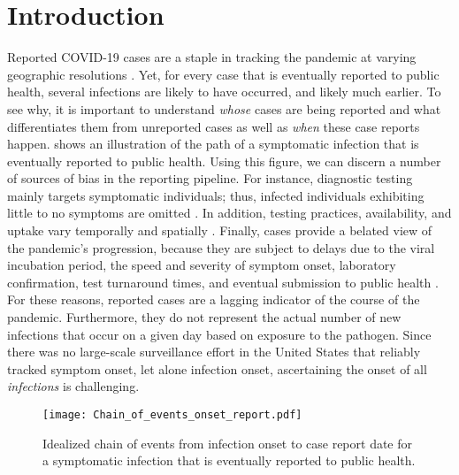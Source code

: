 \section{Introduction}
\label{sec:intro}

Reported COVID-19 cases are a staple in tracking the pandemic at varying
geographic resolutions \citep{dong2020interactive, nyt2020corona,
wp2020tracking}. Yet, for every case that is eventually reported to public
health, several infections are likely to have occurred, and likely much earlier. To
see why, it is important to understand \emph{whose} cases are being reported and
what differentiates them from unreported cases as well as \emph{when} these
case reports happen.  shows an
illustration of the path of a symptomatic infection that is eventually
reported to public health. Using this figure, we can discern a number of sources
of bias in the reporting pipeline. For instance, diagnostic testing mainly
targets symptomatic individuals; thus, infected individuals exhibiting little to
no symptoms are omitted \citep{cdc2022estimated}. In addition, testing
practices, availability, and uptake vary temporally and spatially
\citep{pitzer2021impact, ecdc2020strategies, hitchings2021usefulness}. Finally,
cases provide a belated view of the pandemic's progression, because they are
subject to delays due to the viral incubation period, the speed and severity of
symptom onset, laboratory confirmation, test turnaround times, and eventual
submission to public health \citep{pellis2021challenges, wash2020dash}. For
these reasons, reported cases are a lagging indicator of the course of the
pandemic. Furthermore, they do not represent the actual number of new infections
that occur on a given day based on exposure to the pathogen. Since there
was no large-scale surveillance effort in the United States that reliably
tracked symptom onset, let alone infection onset, ascertaining the onset of all
\emph{infections} is challenging.

\begin{figure}[H]
\centering
    \texttt{[image: Chain\_of\_events\_onset\_report.pdf]} 
    \caption{Idealized chain of events from infection onset to case report date 
    for a symptomatic infection that is eventually reported to public health.}
    \label{fig:chain_events_onset_report}
\end{figure}


